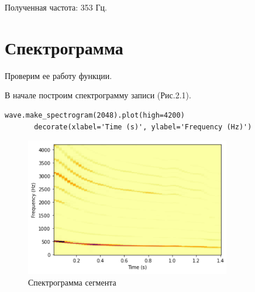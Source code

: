 \documentclass[a4paper,12pt]{report}
\begin{document}
    Полученная частота: 353 Гц.

\section{Спектрограмма}        
    Проверим ее работу функции.
    
    В начале построим спектрограмму записи (Рис.2.1).
\begin{lstlisting}[caption=Построение спектрограммы]
       wave.make_spectrogram(2048).plot(high=4200)
       decorate(xlabel='Time (s)', ylabel='Frequency (Hz)')
\end{lstlisting} 
\begin{figure}[H]
        \centering
        \includegraphics[width=0.8\textwidth]{fig2-1.PNG}
        \caption{Спектрограмма сегмента}
        \label{fig:fig2-1}
\end{figure} 
    
\end{document}
